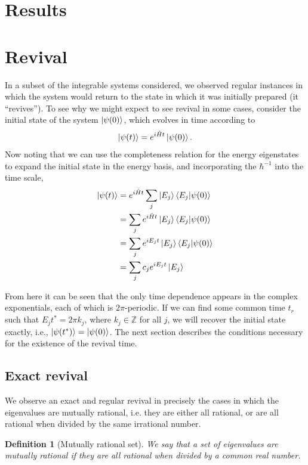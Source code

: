 \documentclass[a4paper, 10pt]{article}
\theoremstyle{plain}
\newtheorem{definition}[]{Definition}
\begin{document}
\section{Results}

\section{Revival \label{revival}}

In a subset of the integrable systems considered, we observed regular instances
in which the system would return to the state in which it was initially
prepared (it ``revives''). To see why we might expect to see revival in
some cases, consider the initial state of the system $\ket{\psi(0)}$, which
evolves in time according to
\begin{equation}
 \ket{\psi(t)}=e^{i\hat{H}t}\ket{\psi(0)}.
\end{equation}
Now noting that we can use the completeness relation for the energy eigenstates
to expand the initial state in the energy basis, and incorporating the
$\hbar^{-1}$ into the time scale,
\begin{align}
\label{time_evolution}
 \ket{\psi(t)} &= e^{i\hat{H}t}\sum_j\ket{E_j}\braket{E_j|\psi(0)}  \nonumber \\
               &= \sum_je^{i\hat{H}t}\ket{E_j}\braket{E_j|\psi(0)}  \nonumber \\
               &= \sum_je^{iE_{j}t}\ket{E_j}\braket{E_j|\psi(0)}    \nonumber \\
               &= \sum_j c_{j}e^{iE_{j}t}\ket{E_j}
\end{align}

From here it can be seen that the only time dependence appears in the complex
exponentials, each of which is $2\pi$-periodic. If we can find some common
time $t_r$ such that $E_{j} t^*=2 \pi k_{j}$, where $k_{j} \in \mathbb{Z} $
for all $j$, we will recover the initial state exactly, i.e.,
$\ket{\psi(t^*)}=\ket{\psi(0)}$. The next section describes the conditions
necessary for the existence of the revival time.\\


\subsection{Exact revival}

We observe an exact and regular revival in precisely the cases in which the
eigenvalues are mutually rational, i.e. they are either all rational, or are all
rational when divided by the same irrational number.
\begin{definition}[Mutually rational set]
    We say that a set of eigenvalues are mutually rational if they are all
    rational when divided by a common real number.
\end{definition}
\end{document}
